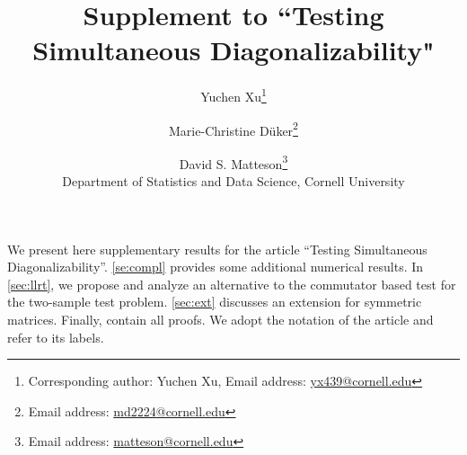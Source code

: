 \documentclass[12pt]{article}
\numberwithin{equation}{section}
\numberwithin{table}{section}
\numberwithin{thm}{section}
\numberwithin{defn}{section}
\numberwithin{lem}{section}
\numberwithin{prop}{section}
\numberwithin{cor}{section}
\numberwithin{rem}{section}
\begin{document}
%

\def\spacingset#1{\renewcommand{\baselinestretch}%
{#1}\small\normalsize} \spacingset{1}




  \title{\LARGE\bf Supplement to ``Testing Simultaneous Diagonalizability"}
  \author{Yuchen Xu\thanks{Corresponding author: Yuchen Xu, Email address: \href{mailto:yx439@cornell.edu}{yx439@cornell.edu}}
    \and
    Marie-Christine D\"uker\thanks{Email address: \href{mailto:md2224@cornell.edu}{md2224@cornell.edu}}
    \and
    David S. Matteson\thanks{Email address: \href{mailto:matteson@cornell.edu}{matteson@cornell.edu}}
    \hspace{.7cm}\\
    Department of Statistics and Data Science, Cornell University}
  \maketitle

We present here supplementary results for the article “Testing Simultaneous Diagonalizability”. \autoref{se:compl} provides some additional numerical results. In \autoref{sec:llrt}, we propose and analyze an alternative to the commutator based test for the two-sample test problem.
\autoref{sec:ext} discusses an extension for symmetric matrices.
Finally,  contain all proofs.
We adopt the notation of the article and refer to its labels.
\end{document}
